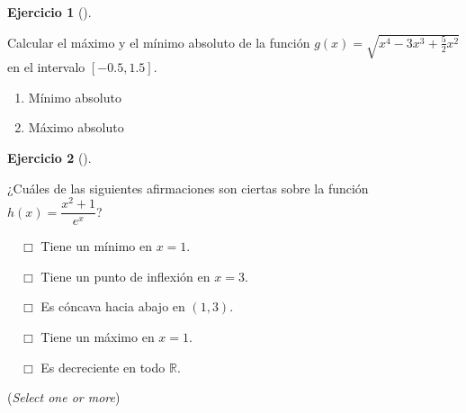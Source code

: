 \documentclass[
  a4paper,
]{scrreport}
\theoremstyle{definition}
\newtheorem{exercise}{Ejercicio}[chapter]
\theoremstyle{remark}
\begin{document}
\begin{exercise}[]\protect\hypertarget{exr-extremos-absolutos}{}\label{exr-extremos-absolutos}

Calcular el máximo y el mínimo absoluto de la función
\(g(x)=\sqrt{x^4-3x^3+\frac{5}{2}x^2}\) en el intervalo \([-0.5,1.5]\).

\begin{enumerate}
\def\labelenumi{\alph{enumi}.}
\item
  Mínimo absoluto

  \vspace{18pt}
\item
  Máximo absoluto

  \vspace{18pt}
\end{enumerate}

\end{exercise}

\begin{exercise}[]\protect\hypertarget{exr-extremos-puntos-inflexion}{}\label{exr-extremos-puntos-inflexion}

¿Cuáles de las siguientes afirmaciones son ciertas sobre la función
\(h(x)=\dfrac{x^2+1}{e^x}\)?

${\quad\Box}$ Tiene un mínimo en $x=1$.

${\quad\Box}$ Tiene un punto de inflexión en $x=3$.

${\quad\Box}$ Es cóncava hacia abajo en $(1,3)$.

${\quad\Box}$ Tiene un máximo en $x=1$.

${\quad\Box}$ Es decreciente en todo $\mathbb{R}$.

(\emph{Select one or more})

\end{exercise}
\end{document}
